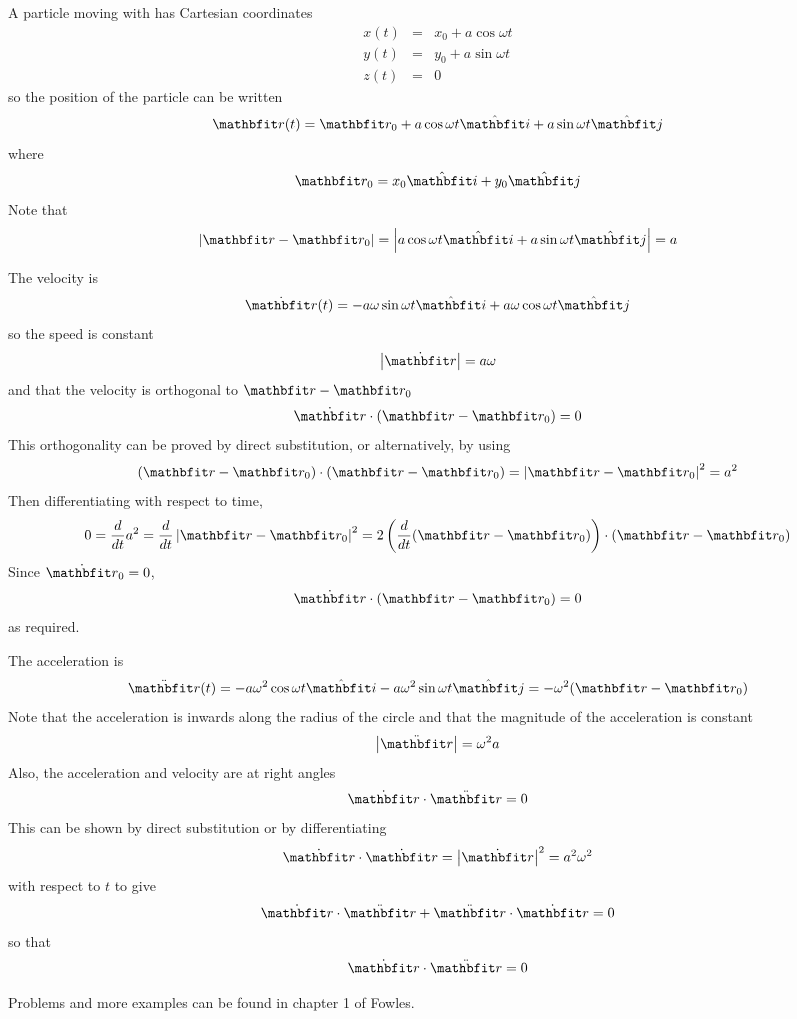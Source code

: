 \begin{example}
A particle moving with  has Cartesian 
coordinates
\begin{eqnarray*}
x(t)&=&x_0+a\cos\omega t\\
y(t)&=&y_0+a\sin\omega t\\
z(t)&=&0
\end{eqnarray*}
so the position of the particle can be written
$$\vect{r}(t)=\vect{r}_0+a\cos\omega t\ivect+a\sin\omega t\jvect$$
where
$$\vect{r}_0=x_0\ivect+y_0\jvect$$
Note that
$$\left|\vect{r}-\vect{r}_0\right|
=\left|a\cos\omega t\ivect+a\sin\omega t\jvect\right|=a$$

The velocity is
$$\dot{\vect{r}}(t)=-a\omega\sin\omega t\ivect+a\omega\cos\omega t\jvect$$
so the speed is constant
$$\left|\dot{\vect{r}}\right|=a\omega$$
and that the velocity is orthogonal to $\vect{r}-\vect{r}_0$
$$\dot{\vect{r}}\cdot\left(\vect{r}-\vect{r}_0\right)=0$$
This orthogonality can be proved by direct substitution, or alternatively,
by using 
$$\left(\vect{r}-\vect{r}_0\right)\cdot\left(\vect{r}-\vect{r}_0\right)
=\left|\vect{r}-\vect{r}_0\right|^2=a^2$$
Then differentiating with respect to time, 
$$0=\dbd{t}a^2=\dbd{t}\left|\vect{r}-\vect{r}_0\right|^2
=2\left(\dbd{t}(\vect{r}-\vect{r}_0)\right)
\cdot\left(\vect{r}-\vect{r}_0\right)$$
Since $\dot{\vect{r}}_0=0$, 
$$\dot{\vect{r}}\cdot\left(\vect{r}-\vect{r}_0\right)=0$$
as required.

The acceleration is
$$\ddot{\vect{r}}(t)=-a\omega^2\cos\omega t\ivect
-a\omega^2\sin\omega t\jvect=-\omega^2 (\vect{r}-\vect{r}_0)$$
Note that the acceleration is inwards along the radius of the circle and
that the magnitude of the acceleration is constant
$$\left|\ddot{\vect{r}}\right|=\omega^2 a$$
Also, the acceleration and velocity are at right angles
$$\dot{\vect{r}}\cdot\ddot{\vect{r}}=0$$
This can be shown by direct substitution or by differentiating 
$$\dot{\vect{r}}\cdot\dot{\vect{r}}=\left|\dot{\vect{r}}\right|^2
=a^2\omega^2$$
with respect to $t$ to give
$$\dot{\vect{r}}\cdot\ddot{\vect{r}}+\ddot{\vect{r}}\cdot\dot{\vect{r}}=0$$
so that
$$\dot{\vect{r}}\cdot\ddot{\vect{r}}=0$$
\end{example}

\begin{exercise}
Problems and more examples can be found in chapter 1 of Fowles.
\end{exercise}


